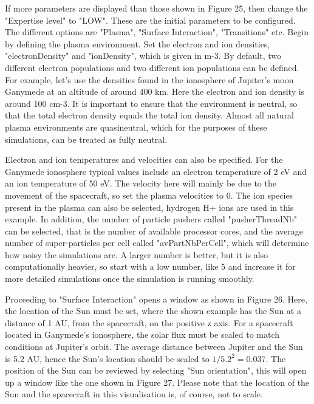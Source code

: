\documentclass[a4paper, 11pt]{article}
\begin{document}
If more parameters are displayed than those shown in Figure 25, then change the "Expertise level" to "LOW". These are the initial parameters to be configured. The different options are "Plasma", "Surface Interaction", "Transitions" etc. Begin by defining the plasma environment. Set the electron and ion densities, "electronDensity" and "ionDensity", which is given in m-3. By default, two different electron populations and two different ion populations can be defined. For example, let's use the densities found in the ionosphere of Jupiter's moon Ganymede at an altitude of around 400 km. Here the electron and ion density is around 100 cm-3. It is important to ensure that the environment is neutral, so that the total electron density equals the total ion density. Almost all natural plasma environments are quasineutral, which for the purposes of these simulations, can be treated as fully neutral.\par
Electron and ion temperatures and velocities can also be specified. For the Ganymede ionosphere typical values include an electron temperature of 2 eV and an ion temperature of 50 eV. The velocity here will mainly be due to the movement of the spacecraft, so set the plasma velocities to 0. The ion species present in the plasma can also be selected, hydrogen H+ ions are used in this example. In addition, the number of particle pushers called "pusherThreadNb" can be selected, that is the number of available processor cores, and the average number of super-particles per cell called "avPartNbPerCell", which will determine how noisy the simulations are. A larger number is better, but it is also computationally heavier, so start with a low number, like 5 and increase it for more detailed simulations once the simulation is running smoothly.\par
Proceeding to "Surface Interaction" opens a window as shown in Figure 26. Here, the location of the Sun must be set, where the shown example has the Sun at a distance of 1 AU, from the spacecraft, on the positive z axis. For a spacecraft located in Ganymede's ionosphere, the solar flux must be scaled to match conditions at Jupiter's orbit. The average distance between Jupiter and the Sun is 5.2 AU, hence the Sun's location should be scaled to $1/5.2^2 = 0.037$. The position of the Sun can be reviewed by selecting "Sun orientation", this will open up a window like the one shown in Figure 27. Please note that the location of the Sun and the spacecraft in this visualisation is, of course, not to scale.\par
\end{document}
